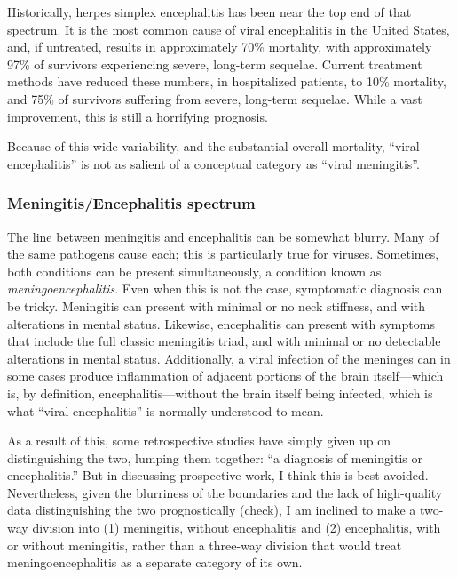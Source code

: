 \documentclass[12pt]{article}
\begin{document}
            Historically, herpes simplex encephalitis has been near the top end of that spectrum. It is the most common cause of viral encephalitis in the United States, and, if untreated, results in approximately 70\% mortality, with approximately 97\% of survivors experiencing severe, long-term sequelae. Current treatment methods have reduced these numbers, in hospitalized patients, to 10\% mortality, and 75\% of survivors suffering from severe, long-term sequelae. While a vast improvement, this is still a horrifying prognosis.
            
            Because of this wide variability, and the substantial overall mortality, ``viral encephalitis'' is not as salient of a conceptual category as ``viral meningitis''.

        \subsubsection{Meningitis/Encephalitis spectrum}
            \label{spectrum}
            The line between meningitis and encephalitis can be somewhat blurry. Many of the same pathogens cause each; this is particularly true for viruses. Sometimes, both conditions can be present simultaneously, a condition known as \textit{meningoencephalitis}. Even when this is not the case, symptomatic diagnosis can be tricky. Meningitis can present with minimal or no neck stiffness, and with alterations in mental status. Likewise, encephalitis can present with symptoms that include the full classic meningitis triad, and with minimal or no detectable alterations in mental status. Additionally, a viral infection of the meninges can in some cases produce inflammation of adjacent portions of the brain itself---which is, by definition, encephalitis---without the brain itself being infected, which is what ``viral encephalitis'' is normally understood to mean.

            As a result of this, some retrospective studies have simply given up on distinguishing the two, lumping them together: ``a diagnosis of meningitis or encephalitis.'' But in discussing prospective work, I think this is best avoided. Nevertheless, given the blurriness of the boundaries and the lack of high-quality data distinguishing the two prognostically (check), I am inclined to make a two-way division into (1) meningitis, without encephalitis and (2) encephalitis, with or without meningitis, rather than a three-way division that would treat meningoencephalitis as a separate category of its own.
        
\end{document}
